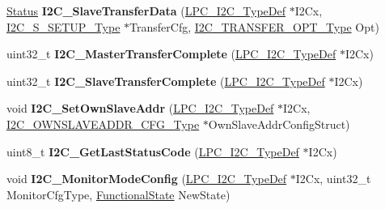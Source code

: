 \begin{DoxyCompactItemize}
\item 
\hypertarget{group___i2_c___public___functions_gab855dcf9fa8a95da591c532dbb92af31}{\hyperlink{group___l_p_c___types___public___types_ga67a0db04d321a74b7e7fcfd3f1a3f70b}{\-Status} {\bfseries \-I2\-C\-\_\-\-Slave\-Transfer\-Data} (\hyperlink{struct_l_p_c___i2_c___type_def}{\-L\-P\-C\-\_\-\-I2\-C\-\_\-\-Type\-Def} $\ast$\-I2\-Cx, \hyperlink{struct_i2_c___s___s_e_t_u_p___type}{\-I2\-C\-\_\-\-S\-\_\-\-S\-E\-T\-U\-P\-\_\-\-Type} $\ast$\-Transfer\-Cfg, \hyperlink{group___i2_c___public___types_gacbdb9912dc18d79d425d9ac7e1333095}{\-I2\-C\-\_\-\-T\-R\-A\-N\-S\-F\-E\-R\-\_\-\-O\-P\-T\-\_\-\-Type} \-Opt)}\label{group___i2_c___public___functions_gab855dcf9fa8a95da591c532dbb92af31}

\item 
\hypertarget{group___i2_c___public___functions_gaaad67181341bcd015c958f7d21420d01}{uint32\-\_\-t {\bfseries \-I2\-C\-\_\-\-Master\-Transfer\-Complete} (\hyperlink{struct_l_p_c___i2_c___type_def}{\-L\-P\-C\-\_\-\-I2\-C\-\_\-\-Type\-Def} $\ast$\-I2\-Cx)}\label{group___i2_c___public___functions_gaaad67181341bcd015c958f7d21420d01}

\item 
\hypertarget{group___i2_c___public___functions_ga6380268c476af8b17b7ef13f05e404d4}{uint32\-\_\-t {\bfseries \-I2\-C\-\_\-\-Slave\-Transfer\-Complete} (\hyperlink{struct_l_p_c___i2_c___type_def}{\-L\-P\-C\-\_\-\-I2\-C\-\_\-\-Type\-Def} $\ast$\-I2\-Cx)}\label{group___i2_c___public___functions_ga6380268c476af8b17b7ef13f05e404d4}

\item 
\hypertarget{group___i2_c___public___functions_ga04a15375bbb68c96a97279b192ee7a5a}{void {\bfseries \-I2\-C\-\_\-\-Set\-Own\-Slave\-Addr} (\hyperlink{struct_l_p_c___i2_c___type_def}{\-L\-P\-C\-\_\-\-I2\-C\-\_\-\-Type\-Def} $\ast$\-I2\-Cx, \hyperlink{struct_i2_c___o_w_n_s_l_a_v_e_a_d_d_r___c_f_g___type}{\-I2\-C\-\_\-\-O\-W\-N\-S\-L\-A\-V\-E\-A\-D\-D\-R\-\_\-\-C\-F\-G\-\_\-\-Type} $\ast$\-Own\-Slave\-Addr\-Config\-Struct)}\label{group___i2_c___public___functions_ga04a15375bbb68c96a97279b192ee7a5a}

\item 
\hypertarget{group___i2_c___public___functions_ga268c8c03cf0f006b58d0e9ad8c00e141}{uint8\-\_\-t {\bfseries \-I2\-C\-\_\-\-Get\-Last\-Status\-Code} (\hyperlink{struct_l_p_c___i2_c___type_def}{\-L\-P\-C\-\_\-\-I2\-C\-\_\-\-Type\-Def} $\ast$\-I2\-Cx)}\label{group___i2_c___public___functions_ga268c8c03cf0f006b58d0e9ad8c00e141}

\item 
\hypertarget{group___i2_c___public___functions_gaef7e2d007e73a69844eafebfbc3e6862}{void {\bfseries \-I2\-C\-\_\-\-Monitor\-Mode\-Config} (\hyperlink{struct_l_p_c___i2_c___type_def}{\-L\-P\-C\-\_\-\-I2\-C\-\_\-\-Type\-Def} $\ast$\-I2\-Cx, uint32\-\_\-t \-Monitor\-Cfg\-Type, \hyperlink{group___l_p_c___types___public___types_gac9a7e9a35d2513ec15c3b537aaa4fba1}{\-Functional\-State} \-New\-State)}\label{group___i2_c___public___functions_gaef7e2d007e73a69844eafebfbc3e6862}


\end{DoxyCompactItemize}
